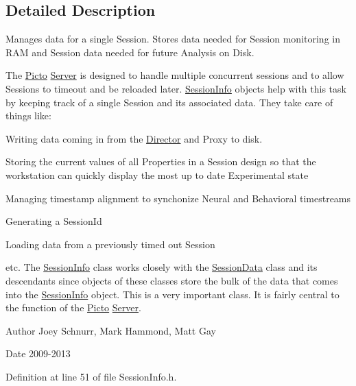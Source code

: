 \subsection{Detailed Description}
Manages data for a single Session. Stores data needed for Session monitoring in R\-A\-M and Session data needed for future Analysis on Disk. 

The \hyperlink{namespace_picto}{Picto} \hyperlink{class_server}{Server} is designed to handle multiple concurrent sessions and to allow Sessions to timeout and be reloaded later. \hyperlink{class_session_info}{Session\-Info} objects help with this task by keeping track of a single Session and its associated data. They take care of things like\-:
\begin{DoxyItemize}
\item Writing data coming in from the \hyperlink{class_director}{Director} and Proxy to disk.
\item Storing the current values of all Properties in a Session design so that the workstation can quickly display the most up to date Experimental state
\item Managing timestamp alignment to synchonize Neural and Behavioral timestreams
\item Generating a Session\-Id
\item Loading data from a previously timed out Session
\item etc. The \hyperlink{class_session_info}{Session\-Info} class works closely with the \hyperlink{class_session_data}{Session\-Data} class and its descendants since objects of these classes store the bulk of the data that comes into the \hyperlink{class_session_info}{Session\-Info} object. This is a very important class. It is fairly central to the function of the \hyperlink{namespace_picto}{Picto} \hyperlink{class_server}{Server}. \begin{DoxyAuthor}{Author}
Joey Schnurr, Mark Hammond, Matt Gay 
\end{DoxyAuthor}
\begin{DoxyDate}{Date}
2009-\/2013 
\end{DoxyDate}

\end{DoxyItemize}

Definition at line 51 of file Session\-Info.\-h.



